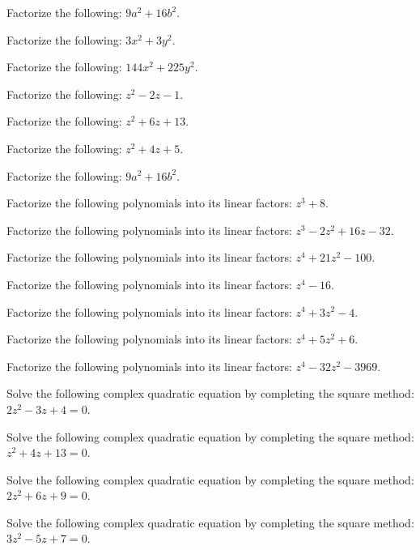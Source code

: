 \documentclass[11pt,a4paper]{article}
\begin{document}
\begin{shortlist}
\item Factorize the following: $9a^2+16b^2$.

\item Factorize the following: $3x^2+3y^2$.

\item Factorize the following: $144x^2+225y^2$.

\item Factorize the following: $z^2-2z-1$.

\item Factorize the following: $z^2+6z+13$.

\item Factorize the following: $z^2+4z+5$.

\item Factorize the following: $9a^2+16b^2$.

\item Factorize the following polynomials into its linear factors: $z^3+8$.

\item Factorize the following polynomials into its linear factors: $z^3-2z^2+16z-32$.

\item Factorize the following polynomials into its linear factors: $z^4+21z^2-100$.

\item Factorize the following polynomials into its linear factors: $z^4-16$.

\item Factorize the following polynomials into its linear factors: $z^4+3z^2-4$.

\item Factorize the following polynomials into its linear factors: $z^4+5z^2+6$.

\item Factorize the following polynomials into its linear factors: $z^4-32z^2-3969$.

\item Solve the following complex quadratic equation by completing the square method: $2z^2-3z+4=0$.

\item Solve the following complex quadratic equation by completing the square method: $z^2+4z+13=0$.

\item Solve the following complex quadratic equation by completing the square method: $2z^2+6z+9=0$.

\item Solve the following complex quadratic equation by completing the square method: $3z^2-5z+7=0$.


\end{shortlist}
\end{document}
